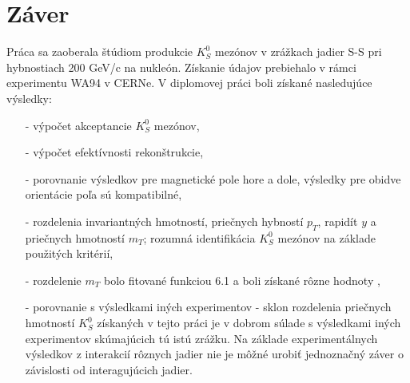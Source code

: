 \chapter{Záver}
Práca sa zaoberala štúdiom produkcie $K^{0}_{S}$ mezónov v zrážkach jadier
S-S pri hybnostiach 200 GeV/c na nukleón. Získanie  údajov prebiehalo v
rámci experimentu WA94 v CERNe.
%
V diplomovej práci boli získané nasledujúce výsledky:
\begin{itemize}
\item[-] výpočet akceptancie $K^{0}_{S}$ mezónov,
\item[-] výpočet efektívnosti rekonštrukcie,
\item[-] porovnanie výsledkov pre magnetické pole hore a dole, výsledky
  pre obidve orientácie poľa sú kompatibilné,

\item[-] rozdelenia invariantných hmotností, priečnych hybností $p_{T}$,
  rapidít $y$ a prie\-čnych hmotností $m_{T}$;  rozumná identifikácia
  $K^{0}_{S}$ mezónov na základe použitých kritérií,
\item[-] rozdelenie $m_{T}$ bolo fitované funkciou 6.1 a boli získané
  rôzne hodnoty ,
\item[-] porovnanie s výsledkami iných experimentov - sklon rozdelenia
  priečnych hmotností $K^{0}_{S}$ získaných v tejto práci je v dobrom súlade
  s výsledkami iných experimentov skúmajúcich tú istú zrážku. Na základe
  experimentálnych výsledkov z interakcií rôznych jadier nie je môžné urobiť
  jednoznačný záver o závislosti  od interagujúcich jadier.
\end{itemize}


%
%
